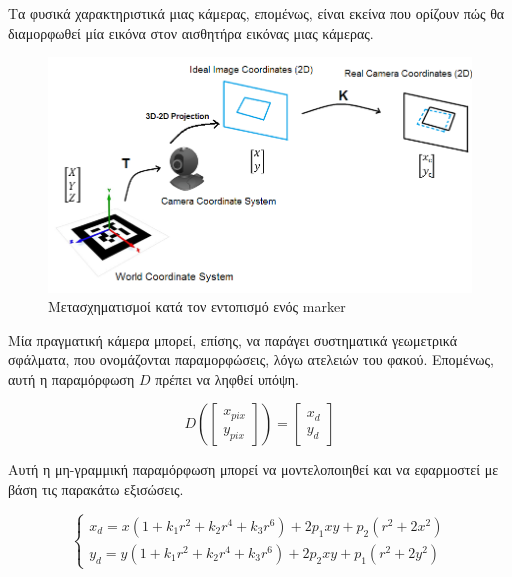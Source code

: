 Τα φυσικά χαρακτηριστικά μιας κάμερας, επομένως, είναι εκείνα που ορίζουν πώς θα διαμορφωθεί μία εικόνα στον αισθητήρα εικόνας μιας κάμερας.

\begin{figure}[H]
    \centering
    \includegraphics[scale=1.1, angle=0]{Files/Figures/transformation1.png}
    \caption[Μετασχηματισμοί κατά τον εντοπισμό ενός marker.]{ Μετασχηματισμοί κατά τον εντοπισμό ενός marker}
    \label{fig:transformation1}
\end{figure}


Mία πραγματική κάμερα μπορεί, επίσης, να παράγει συστηματικά γεωμετρικά σφάλματα, που ονομάζονται παραμορφώσεις, λόγω ατελειών του φακού. 
Επομένως, αυτή η παραμόρφωση $D$ πρέπει να ληφθεί υπόψη.


\begin{equation}
D
\left(
\begin{bmatrix}
x_{pix}\\
y_{pix}   
\end{bmatrix}
\right )
=
\begin{bmatrix}
x_{d}\\
y_{d}   
\end{bmatrix}
\end{equation} 



Αυτή η μη-γραμμική παραμόρφωση μπορεί να μοντελοποιηθεί και να εφαρμοστεί με βάση τις παρακάτω εξισώσεις. 



\begin{equation}
\begin{cases}x_{d}=x(1+k_{1}r^{2}+k_{2}r^{4}+k_{3}r^{6})+2p_{1}xy+p_{2}(r^{2}+2x^{2})\\
y_{d}=y(1+k_{1}r^{2}+k_{2}r^{4}+k_{3}r^{6})+2p_{2}xy+p_{1}(r^{2}+2y^{2})\end{cases}
\end{equation}

